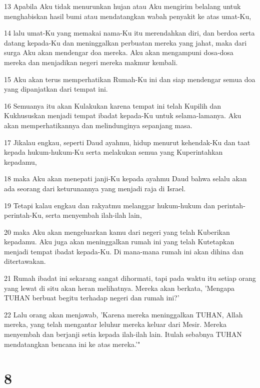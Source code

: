 \par 13 Apabila Aku tidak menurunkan hujan atau Aku mengirim belalang untuk menghabiskan hasil bumi atau mendatangkan wabah penyakit ke atas umat-Ku,
\par 14 lalu umat-Ku yang memakai nama-Ku itu merendahkan diri, dan berdoa serta datang kepada-Ku dan meninggalkan perbuatan mereka yang jahat, maka dari surga Aku akan mendengar doa mereka. Aku akan mengampuni dosa-dosa mereka dan menjadikan negeri mereka makmur kembali.
\par 15 Aku akan terus memperhatikan Rumah-Ku ini dan siap mendengar semua doa yang dipanjatkan dari tempat ini.
\par 16 Semuanya itu akan Kulakukan karena tempat ini telah Kupilih dan Kukhususkan menjadi tempat ibadat kepada-Ku untuk selama-lamanya. Aku akan memperhatikannya dan melindunginya sepanjang masa.
\par 17 Jikalau engkau, seperti Daud ayahmu, hidup menurut kehendak-Ku dan taat kepada hukum-hukum-Ku serta melakukan semua yang Kuperintahkan kepadamu,
\par 18 maka Aku akan menepati janji-Ku kepada ayahmu Daud bahwa selalu akan ada seorang dari keturunannya yang menjadi raja di Israel.
\par 19 Tetapi kalau engkau dan rakyatmu melanggar hukum-hukum dan perintah-perintah-Ku, serta menyembah ilah-ilah lain,
\par 20 maka Aku akan mengeluarkan kamu dari negeri yang telah Kuberikan kepadamu. Aku juga akan meninggalkan rumah ini yang telah Kutetapkan menjadi tempat ibadat kepada-Ku. Di mana-mana rumah ini akan dihina dan ditertawakan.
\par 21 Rumah ibadat ini sekarang sangat dihormati, tapi pada waktu itu setiap orang yang lewat di situ akan heran melihatnya. Mereka akan berkata, 'Mengapa TUHAN berbuat begitu terhadap negeri dan rumah ini?'
\par 22 Lalu orang akan menjawab, 'Karena mereka meninggalkan TUHAN, Allah mereka, yang telah mengantar leluhur mereka keluar dari Mesir. Mereka menyembah dan berjanji setia kepada ilah-ilah lain. Itulah sebabnya TUHAN mendatangkan bencana ini ke atas mereka.'"

\chapter{8}

